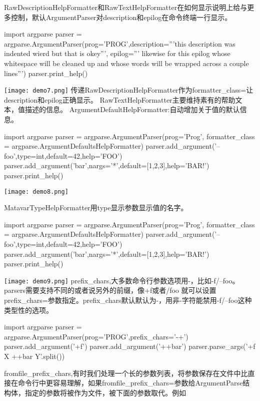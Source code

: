 RawDescriptionHelpFormatter和RawTextHelpFormatter在如何显示说明上给与更多控制，默认ArgumentParser对description和epilog在命令终端一行显示。
\begin{python}
import argparse
parser = argparse.ArgumentParser(prog='PROG',description='''this
 description was indented wierd
but that is okey''',
epilog='''
likewise for this epilog whose whitespace will be
cleaned up and whose words will be wrapped
across a couple lines''')
parser.print_help()
\end{python}
\texttt{[image: demo7.png]}\newline
传递RawDescriptionHelpFormatter作为formatter\_class=让description和epilog正确显示。
RawTextHelpFormatter主要维持素有的帮助文本，值描述的信息。\newline
ArgumentDefaultHelpFormatter:自动增加关于值的默认信息。\newline
\begin{python}
import argparse
parser = argparse.ArgumentParser(prog='Prog',
formatter_class = argparse.ArgumentDefaultsHelpFormatter)
parser.add_argument('--foo',type=int,default=42,help='FOO')
parser.add_argument('bar',nargs='*',default=[1,2,3],help='BAR!')
parser.print_help()
\end{python}
\texttt{[image: demo8.png]}\par
MatavarTypeHelpFormatter用type显示参数显示值的名字。
\begin{python}
import argparse
parser = argparse.ArgumentParser(prog='Prog',
formatter_class = argparse.ArgumentDefaultsHelpFormatter)
parser.add_argument('--foo',type=int,default=42,help='FOO')
parser.add_argument('bar',nargs='*',default=[1,2,3],help='BAR!')
parser.print_help()
\end{python}
\texttt{[image: demo9.png]}\newline
prefix\_chars,大多数命令行参数选项用-，比如-f/--foo。parsers需要支持不同的或者说另外的前缀，像+f或者/foo
就可以设置prefix\_chars=参数指定。prefix\_chars默认默认为-，用非-字符能禁用-f/--foo这种类型性的选项。\newline
\begin{python}
import argparse
parser = argparse.ArgumentParser(prog='PROG',prefix_chars='-+')
parser.add_argument('+f')
parser.add_argument('++bar')
parser.parse_args('+f X ++bar Y'.split())

\end{python}
fromfile\_prefix\_chars,有时我们处理一个长的参数列表，将参数保存在文件中比直接在命令行中更容易理解，如果fromfile\_prefix\_chars=参数给ArgumentParse结构体，指定的参数将被作为文件，被下面的参数取代。例如
